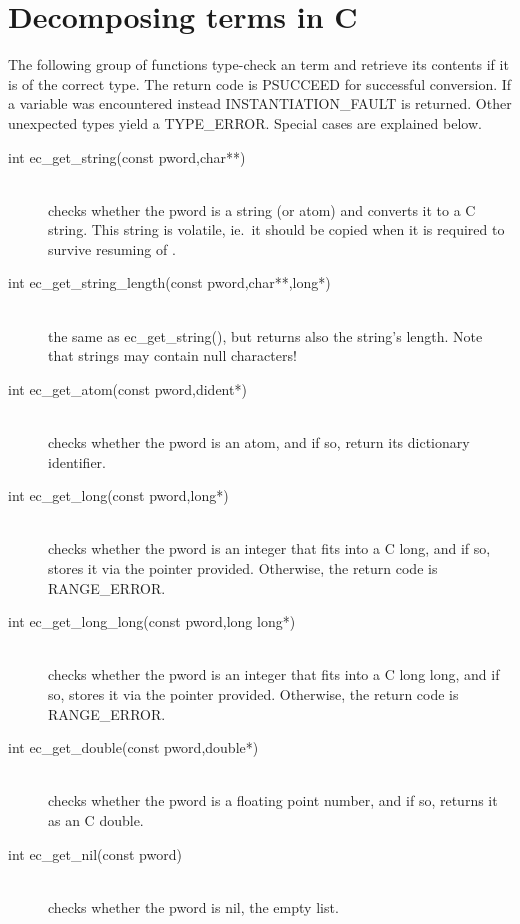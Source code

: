\section{Decomposing {\eclipse} terms in C}
The following group of functions type-check an {\eclipse} term and
retrieve its contents if it is of the correct type.
The return code is PSUCCEED for successful conversion.
If a variable was encountered instead INSTANTIATION_FAULT is returned.
Other unexpected types yield a TYPE_ERROR. Special cases are explained below.
\begin{description}

\item[int		ec_get_string(const pword,char**)]\ \\
	checks whether the {\eclipse} pword is a string (or atom) and converts
	it to a C string. This string is volatile, ie.\ it should be copied
	when it is required to survive resuming of {\eclipse}.

\item[int		ec_get_string_length(const pword,char**,long*)]\ \\
	the same as ec_get_string(), but returns also the string's length.
	Note that {\eclipse} strings may contain null characters!

\item[int		ec_get_atom(const pword,dident*)]\ \\
	checks whether the {\eclipse} pword is an atom, and if so,
	return its dictionary identifier.

\item[int		ec_get_long(const pword,long*)]\ \\
	checks whether the {\eclipse} pword is an integer that fits into
	a C long, and if so, stores it via the pointer provided.
	Otherwise, the return code is RANGE_ERROR.

\item[int		ec_get_long_long(const pword,long long*)]\ \\
	checks whether the {\eclipse} pword is an integer that fits into
	a C long long, and if so, stores it via the pointer provided.
	Otherwise, the return code is RANGE_ERROR.

\item[int		ec_get_double(const pword,double*)]\ \\
	checks whether the {\eclipse} pword is a floating point number,
	and if so, returns it as an C double.

\item[int		ec_get_nil(const pword)]\ \\
	checks whether the {\eclipse} pword is nil, the empty list.


\end{description}
